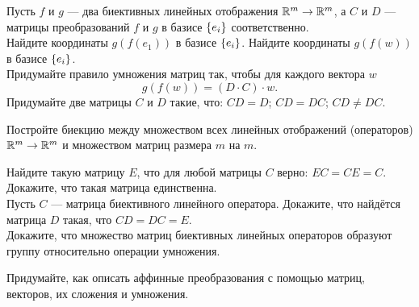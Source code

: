\documentclass[a4paper,12pt]{article}
\begin{document}


    Пусть $f$ и $g$ --- два биективных линейных отображения $\mathbb{R}^m\rightarrow\mathbb{R}^m$,
    а $C$ и $D$  --- матрицы преобразований $f$ и $g$ в базисе $\left\{e_i\right\}$ соответственно.
    \\
    Найдите координаты $g(f(e_1))$ в базисе $\left\{e_i\right\}$.
    Найдите координаты $g(f(w))$ в базисе $\left\{e_i\right\}$.\\
    Придумайте правило умножения матриц так, чтобы для каждого вектора $w$
    $$g(f(w)) = (D\cdot C) \cdot w.$$
\vspace{-6mm}
    Придумайте две матрицы $C$ и $D$ такие, что:
    $C D = D$;
    $C D = D C$;
    $C D \ne D C$.

    Постройте биекцию между множеством всех линейных отображений (операторов) $\mathbb{R}^m\rightarrow\mathbb{R}^m$ и множеством матриц размера $m$ на $m$.


    Найдите такую матрицу $E$, что для любой матрицы $C$ верно: $EC = CE = C$.\\
    Докажите, что такая матрица единственна.\\
    Пусть $C$ --- матрица биективного линейного оператора. Докажите, что найдётся матрица $D$ такая, что $CD=DC=E$.\\
    Докажите, что множество матриц биективных линейных операторов образуют группу относительно операции умножения.


    Придумайте, как описать аффинные преобразования с помощью матриц, векторов, их сложения и умножения.


\end{document}
